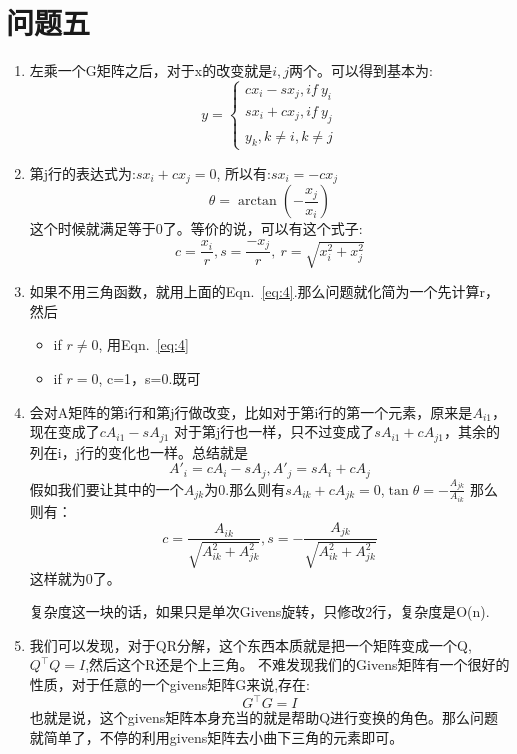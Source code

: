 \documentclass[answers]{exam}  %
\begin{document}
\section{问题五}
\begin{enumerate}[label=\alph*.] 
    \item 左乘一个G矩阵之后，对于x的改变就是$i,j$两个。可以得到基本为:
    \begin{equation*}
        y = 
        \begin{cases}
            cx_i - sx_j, if\ y_i\\
            sx_i + cx_j, if\ y_j\\
            y_k, k\neq i, k \neq j
        \end{cases}
    \end{equation*}
    \item 第j行的表达式为:$sx_i + cx_j = 0$, 所以有:$sx_i = -cx_j$
    \begin{equation*}
        \theta = \arctan(-\frac{x_j}{x_i})
    \end{equation*}
    这个时候就满足等于0了。等价的说，可以有这个式子:
    \begin{equation}
        \label{eq:4}
        c=\frac{x_i}{r},s=\frac{-x_j}{r},\ r=\sqrt{x_i^2+ x_j^2}
    \end{equation}
    \item 如果不用三角函数，就用上面的Eqn.~\ref{eq:4}.那么问题就化简为一个先计算r，然后
    \begin{itemize}
        \item if $r\neq 0$, 用Eqn.~\ref{eq:4}
        \item if $r=0$, c=1，s=0.既可
    \end{itemize}
    \item 会对A矩阵的第i行和第j行做改变，比如对于第i行的第一个元素，原来是$A_{i1}$，现在变成了$cA_{i1}-sA_{j1}$
    对于第j行也一样，只不过变成了$sA_{i1}+cA_{j1}$，其余的列在i，j行的变化也一样。总结就是
    \begin{equation*}
        A'_i=cA_i - sA_j, A'_j = sA_i +cA_j
    \end{equation*}
    假如我们要让其中的一个$A_{jk}$为0.那么则有$sA_{ik} + cA_{jk} = 0$,$\tan\theta = -\frac{A_{jk}}{A_{ik}}$
    那么则有：
    \begin{equation}
        \label{eq:5}
        c = \frac{A_{ik}}{\sqrt{A_{ik}^2 + A_{jk}^2}},s = -\frac{A_{jk}}{\sqrt{A_{ik}^2 + A_{jk}^2}}
    \end{equation}
    这样就为0了。

    复杂度这一块的话，如果只是单次Givens旋转，只修改2行，复杂度是O(n).
    \item  我们可以发现，对于QR分解，这个东西本质就是把一个矩阵变成一个Q,$Q^\top Q = I$,然后这个R还是个上三角。
    不难发现我们的Givens矩阵有一个很好的性质，对于任意的一个givens矩阵G来说,存在:
    \begin{equation*}
        G^\top G = I
    \end{equation*}
    也就是说，这个givens矩阵本身充当的就是帮助Q进行变换的角色。那么问题就简单了，不停的利用givens矩阵去小曲下三角的元素即可。
    

\end{enumerate}
\end{document}
